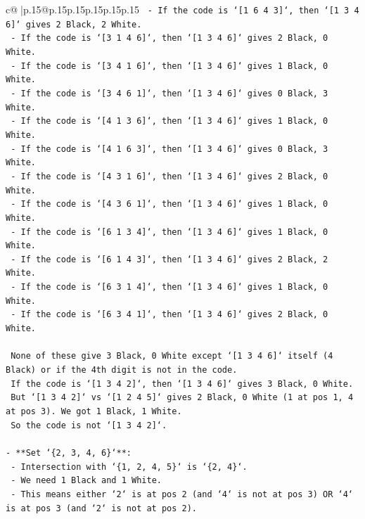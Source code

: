 \documentclass{article}
\begin{document}
{\begin{supertabular}{c@{$\;$}|p{.15\linewidth}@{}p{.15\linewidth}p{.15\linewidth}p{.15\linewidth}p{.15\linewidth}p{.15\linewidth}}
{{{\texttt{    {-} If the code is `{[}1 6 4 3{]}`, then `{[}1 3 4 6{]}` gives 2 Black, 2 White.} \\
\texttt{    {-} If the code is `{[}3 1 4 6{]}`, then `{[}1 3 4 6{]}` gives 2 Black, 0 White.} \\
\texttt{    {-} If the code is `{[}3 4 1 6{]}`, then `{[}1 3 4 6{]}` gives 1 Black, 0 White.} \\
\texttt{    {-} If the code is `{[}3 4 6 1{]}`, then `{[}1 3 4 6{]}` gives 0 Black, 3 White.} \\
\texttt{    {-} If the code is `{[}4 1 3 6{]}`, then `{[}1 3 4 6{]}` gives 1 Black, 0 White.} \\
\texttt{    {-} If the code is `{[}4 1 6 3{]}`, then `{[}1 3 4 6{]}` gives 0 Black, 3 White.} \\
\texttt{    {-} If the code is `{[}4 3 1 6{]}`, then `{[}1 3 4 6{]}` gives 2 Black, 0 White.} \\
\texttt{    {-} If the code is `{[}4 3 6 1{]}`, then `{[}1 3 4 6{]}` gives 1 Black, 0 White.} \\
\texttt{    {-} If the code is `{[}6 1 3 4{]}`, then `{[}1 3 4 6{]}` gives 1 Black, 0 White.} \\
\texttt{    {-} If the code is `{[}6 1 4 3{]}`, then `{[}1 3 4 6{]}` gives 2 Black, 2 White.} \\
\texttt{    {-} If the code is `{[}6 3 1 4{]}`, then `{[}1 3 4 6{]}` gives 1 Black, 0 White.} \\
\texttt{    {-} If the code is `{[}6 3 4 1{]}`, then `{[}1 3 4 6{]}` gives 2 Black, 0 White.} \\
\\ 
\texttt{    None of these give 3 Black, 0 White except `{[}1 3 4 6{]}` itself (4 Black) or if the 4th digit is not in the code.} \\
\texttt{    If the code is `{[}1 3 4 2{]}`, then `{[}1 3 4 6{]}` gives 3 Black, 0 White.} \\
\texttt{    But `{[}1 3 4 2{]}` vs `{[}1 2 4 5{]}` gives 2 Black, 0 White (1 at pos 1, 4 at pos 3). We got 1 Black, 1 White.} \\
\texttt{    So the code is not `{[}1 3 4 2{]}`.} \\
\\ 
\texttt{{-} **Set `\{2, 3, 4, 6\}`**:} \\
\texttt{    {-} Intersection with `\{1, 2, 4, 5\}` is `\{2, 4\}`.} \\
\texttt{    {-} We need 1 Black and 1 White.} \\
\texttt{    {-} This means either `2` is at pos 2 (and `4` is not at pos 3) OR `4` is at pos 3 (and `2` is not at pos 2).} \\
}}}
\end{supertabular}}
\end{document}
